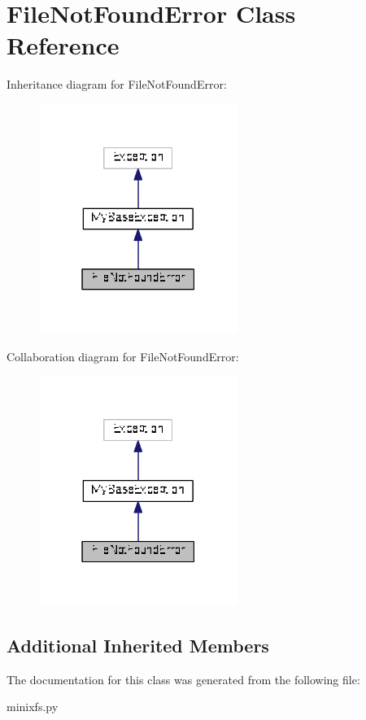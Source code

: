 \hypertarget{classminixfs_1_1_file_not_found_error}{}\section{File\+Not\+Found\+Error Class Reference}
\label{classminixfs_1_1_file_not_found_error}


Inheritance diagram for File\+Not\+Found\+Error\+:
\nopagebreak
\begin{figure}[H]
\begin{center}
\leavevmode
\includegraphics[width=183pt]{classminixfs_1_1_file_not_found_error__inherit__graph}
\end{center}
\end{figure}


Collaboration diagram for File\+Not\+Found\+Error\+:
\nopagebreak
\begin{figure}[H]
\begin{center}
\leavevmode
\includegraphics[width=183pt]{classminixfs_1_1_file_not_found_error__coll__graph}
\end{center}
\end{figure}
\subsection*{Additional Inherited Members}


The documentation for this class was generated from the following file\+:\begin{DoxyCompactItemize}
\item 
minixfs.\+py\end{DoxyCompactItemize}
